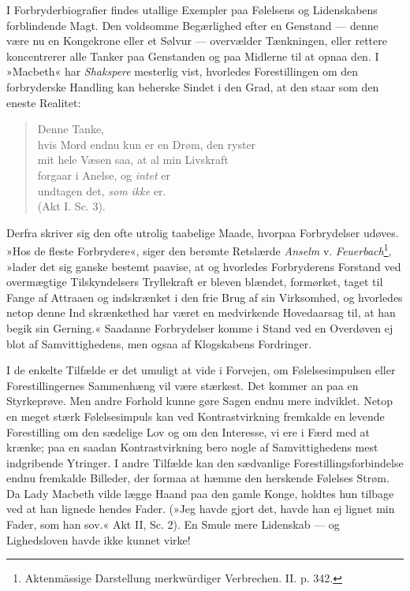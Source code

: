 \documentclass[12pt,a4paper,openany]{book}
\newcommand{\opage}[1]{\marginnote{\footnotesize\textit{[#1]}}}
\begin{document}
I Forbryderbiografier findes utallige Exempler paa Følelsens og
Lidenskabens forblindende Magt. Den voldsomme Begærlighed efter en
Genstand --- denne være nu en Kongekrone eller et Sølvur --- overvælder
Tænkningen, eller rettere koncentrerer alle Tanker paa Genstanden og paa
Midlerne til at opnaa den. I »Macbeth« har \emph{Shakspere} mesterlig
vist, hvorledes Forestillingen om den forbryderske Handling kan beherske
Sindet i den Grad, at den staar som den eneste Realitet:

\begin{verse}
Denne Tanke,\\
hvis Mord endnu kun er en Drøm, den ryster\\
mit hele Væsen saa, at al min Livskraft\\
forgaar i Anelse, og \emph{intet} er\\
undtagen det, \emph{som ikke} er.\\
\hspace*{\fill}(Akt I. Sc. 3).
\end{verse}
\noindent Derfra skriver sig den ofte utrolig taabelige Maade,
hvorpaa Forbrydelser udøves. »Hos de fleste Forbrydere«, siger den
berømte Retslærde \emph{Anselm} v.
\emph{Feuerbach}\footnote[1]{Aktenmässige Darstellung merkwürdiger
Verbrechen. II. p. 342.}, »lader det sig ganske bestemt paavise, at og
hvorledes Forbryderens Forstand ved overmægtige Tilskyndelsers
Tryllekraft er bleven blændet, formørket, taget til Fange af Attraaen og
indskrænket i den frie Brug af sin Virksomhed, og hvorledes netop denne
Ind%
\opage{355}skrænkethed har været en medvirkende Hovedaarsag til, at han
begik sin Gerning.« Saadanne Forbrydelser komme i Stand ved en Overdøven
ej blot af Samvittighedens, men ogsaa af Klogskabens Fordringer.

I de enkelte Tilfælde er det umuligt at vide i Forvejen, om
Følelsesimpulsen eller Forestillingernes Sammenhæng vil være stærkest.
Det kommer an paa en Styrkeprøve. Men andre Forhold kunne gøre Sagen
endnu mere indviklet. Netop en meget stærk Følelsesimpuls kan ved
Kontrastvirkning fremkalde en levende Forestilling om den sædelige Lov
og om den Interesse, vi ere i Færd med at krænke; paa en saadan
Kontrastvirkning bero nogle af Samvittighedens mest indgribende
Ytringer. I andre Tilfælde kan den sædvanlige Forestillingsforbindelse
endnu fremkalde Billeder, der formaa at hæmme den herskende Følelses
Strøm. Da Lady Macbeth vilde lægge Haand paa den gamle Konge, holdtes
hun tilbage ved at han lignede hendes Fader. (»Jeg havde gjort det,
havde han ej lignet min Fader, som han sov.« Akt II, Sc. 2). En Smule
mere Lidenskab --- og Lighedsloven havde ikke kunnet virke!
\end{document}
